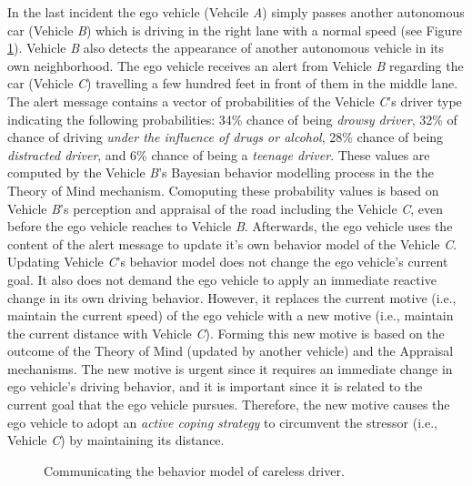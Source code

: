 \documentclass[journal, 11pt]{IEEEtran}
\begin{document}
In the last incident the ego vehicle (Vehcile \textit{A}) simply passes another
autonomous car (Vehicle \textit{B}) which is driving in the right lane with a
normal speed (see Figure \ref{fig:example3}). Vehicle \textit{B} also detects
the appearance of another autonomous vehicle in its own neighborhood. The ego
vehicle receives an alert from Vehicle \textit{B} regarding the car (Vehicle
\textit{C}) travelling a few hundred feet in front of them in the middle lane.
The alert message contains a vector of probabilities of the Vehicle \textit{C}'s
driver type indicating the following probabilities: 34\% chance of being
\textit{drowsy driver}, 32\% of chance of driving \textit{under the influence of
drugs or alcohol}, 28\% chance of being \textit{distracted driver}, and 6\%
chance of being a \textit{teenage driver}. These values are computed by the
Vehicle \textit{B}'s Bayesian behavior modelling process in the the Theory of
Mind mechanism. Comoputing these probability values is based on Vehicle
\textit{B}'s perception and appraisal of the road including the Vehicle
\textit{C}, even before the ego vehicle reaches to Vehicle \textit{B}.
Afterwards, the ego vehicle uses the content of the alert message to update it's
own behavior model of the Vehicle \textit{C}. Updating Vehicle \textit{C}'s
behavior model does not change the ego vehicle's current goal. It also does not
demand the ego vehicle to apply an immediate reactive change in its own driving
behavior. However, it replaces the current motive (i.e., maintain the current
speed) of the ego vehicle with a new motive (i.e., maintain the current distance
with Vehicle \textit{C}). Forming this new motive is based on the outcome of the
Theory of Mind (updated by another vehicle) and the Appraisal mechanisms. The
new motive is urgent since it requires an immediate change in ego vehicle's
driving behavior, and it is important since it is related to the current goal
that the ego vehicle pursues. Therefore, the new motive causes the ego vehicle
to adopt an \textit{active coping strategy} to circumvent the stressor (i.e.,
Vehicle \textit{C}) by maintaining its distance.

\begin{figure}[!t]
  \centerline{}
  \vspace*{-2mm}
  \caption{Communicating the behavior model of careless driver.}
  \label{fig:example3}
  \vspace*{-5mm}
\end{figure}
\end{document}
